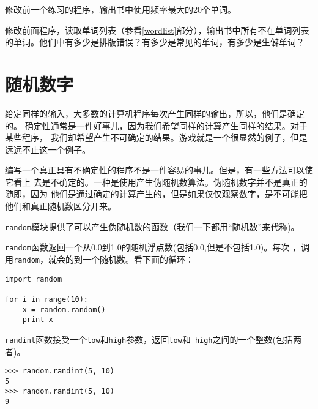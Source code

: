 \begin{ex}
修改前一个练习的程序，输出书中使用频率最大的20个单词。
\end{ex}


\begin{ex}
修改前面程序，读取单词列表（参看\ref{wordlist}部分），输出书中所有不在单词列表
的单词。他们中有多少是排版错误？有多少是常见的单词，有多少是生僻单词？
\end{ex}

\section{随机数字}


给定同样的输入，大多数的计算机程序每次产生同样的输出，所以，他们是确定的。
确定性通常是一件好事儿，因为我们希望同样的计算产生同样的结果。对于某些程序，
我们却希望产生不可确定的结果。游戏就是一个很显然的例子，但是远远不止这一个例子。

编写一个真正具有不确定性的程序不是一件容易的事儿。但是，有一些方法可以使它看上
去是不确定的。一种是使用产生伪随机数算法。伪随机数字并不是真正的随即，因为
他们是通过确定的计算产生的，但是如果仅仅观察数字，是不可能把他们和真正随机数区分开来。



{\tt random}模块提供了可以产生伪随机数的函数（我们一下都用“随机数”来代称)。



{\tt random}函数返回一个从0.0到1.0的随机浮点数(包括0.0,但是不包括1.0)。每次
，调用{\tt random}，就会的到一个随机数。看下面的循环：

\beforeverb
\begin{verbatim}
import random

for i in range(10):
    x = random.random()
    print x
\end{verbatim}
\afterverb

{\tt randint}函数接受一个{\tt low}和{\tt high}参数，返回{\tt low}和{\tt
	high}之间的一个整数(包括两者)。



\beforeverb
\begin{verbatim}
>>> random.randint(5, 10)
5
>>> random.randint(5, 10)
9
\end{verbatim}
\afterverb


